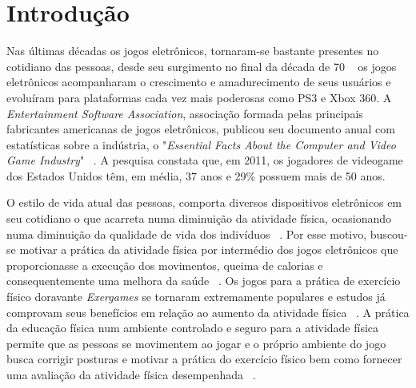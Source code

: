 \chapter{Introdu\c{c}\~{a}o} \label{sec:intro}
Nas últimas décadas os jogos eletrônicos, tornaram-se bastante presentes no cotidiano das pessoas, desde seu surgimento no final da década de 70 ~\cite{moore2011basics} os jogos eletrônicos acompanharam o crescimento e amadurecimento de seus usuários e evoluíram para plataformas cada vez mais poderosas como PS3 e Xbox 360. A \textit{Entertainment Software Association}, associação formada pelas principais fabricantes americanas de jogos eletrônicos, publicou seu documento anual com estatísticas sobre a indústria, o "\textit{Essential Facts About the Computer and Video Game Industry}" ~\cite{esa:facts2011}. A pesquisa constata que, em 2011, os jogadores de videogame dos Estados Unidos têm, em média, 37 anos e 29$\%$ possuem mais de 50 anos.

O estilo de vida atual das pessoas, comporta  diversos dispositivos eletrônicos em seu cotidiano o que acarreta numa diminuição da atividade física, ocasionando numa diminuição da qualidade de vida dos indivíduos ~\cite{maitland}. Por esse motivo, buscou-se motivar a prática da atividade física por intermédio dos jogos eletrônicos que proporcionasse a execução dos movimentos, queima de calorias e consequentemente uma melhora da saúde ~\cite{Suhonen:2008:SFE:1457199.1457204}.  Os jogos para a prática de exercício físico doravante \textit{Exergames} se tornaram extremamente populares e estudos já comprovam seus benefícios em relação ao aumento da atividade física ~\cite{baran08}. A prática da educação física num ambiente controlado e seguro para a atividade física permite que as pessoas se movimentem ao jogar e o próprio ambiente do jogo busca corrigir posturas e motivar a prática do exercício físico bem como fornecer uma avaliação da atividade física desempenhada ~\cite{Hardy2011,vaghetti2011,Suhonen:2008:SFE:1457199.1457204}. 

